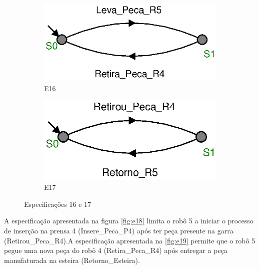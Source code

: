 \begin{figure}[H]%
  \centering
  \begin{subfigure}{0.45\textwidth}
      \centering
      \includegraphics[width=\textwidth]{imagens/E16.eps}
      \caption{E16}
      \label{fig:e16}
  \end{subfigure}
  \hfill
  \begin{subfigure}{0.45\textwidth}
      \centering
      \includegraphics[width=\textwidth]{imagens/E17.eps}
      \caption{E17}
      \label{fig:e17}
  \end{subfigure}
  \caption{Especificações 16 e 17}
  \label{fig:e1617}
\end{figure}

A especificação apresentada na figura \ref{fig:e18} limita o robô 5 a iniciar o processo de inserção na prensa 4 (Insere\_Peca\_P4) após ter peça presente na garra (Retirou\_Peca\_R4).A especificação apresentada na \ref{fig:e19} permite que o robô 5 pegue uma nova peça do robô 4 (Retira\_Peca\_R4) após entregar a peça manufaturada na esteira (Retorno\_Esteira).

